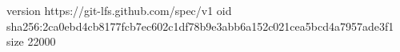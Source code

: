 version https://git-lfs.github.com/spec/v1
oid sha256:2ca0ebd4cb8177fcb7ec602c1df78b9e3abb6a152c021cea5bcd4a7957ade3f1
size 22000
